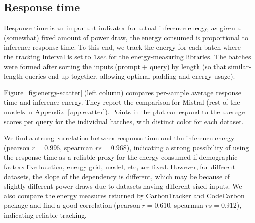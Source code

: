 \subsection{Response time}
\label{sec:responsetime}
Response time is an important indicator for actual inference energy, as given a (somewhat) fixed amount of power draw, the energy consumed is proportional to inference response time. 
To this end, we track the energy for each batch where the tracking interval is set to $1 sec$ for the energy-measuring libraries. The batches were formed after sorting the inputs (prompt + query) by length (so that similar-length queries end up together, allowing optimal padding and energy usage). 

Figure~\ref{fig:energy-scatter} (left column)
compares per-sample average response time and inference energy.
They report the comparison for Mistral (rest of the models in Appendix~\ref{app:scatter}). 
Points in the plot correspond to the average scores per query for the individual batches, with distinct color for each dataset. %


We find a strong correlation between response time and the inference energy (pearson $r = 0.996$, spearman $rs = 0.968$), indicating a strong possibility of using the response time as a reliable proxy for the energy consumed if demographic factors like location, energy grid, model, etc, are fixed.
However, for different datasets, the slope of the dependency is different, which may be because of slightly different power draws due to datasets having different-sized inputs.
We also compare the energy measures returned by CarbonTracker and CodeCarbon package and find a good correlation (pearson $r = 0.610$, spearman $rs = 0.912$), indicating reliable tracking.







